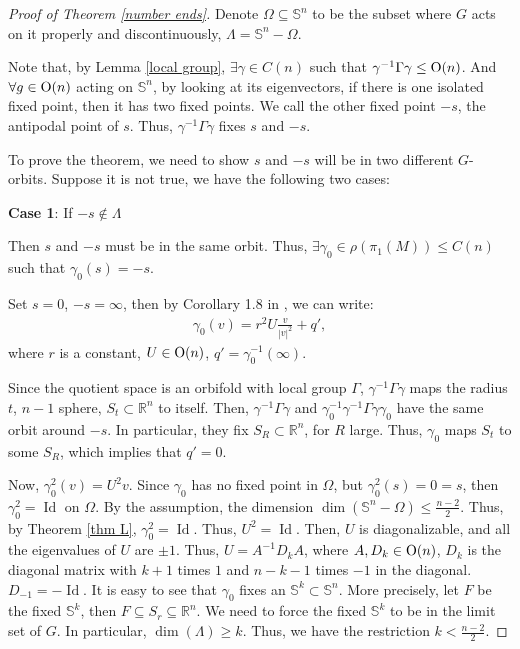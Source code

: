 \documentclass[12pt]{amsart}
\theoremstyle{definition}
\begin{document}
\begin{proof}[Proof of Theorem \ref{number ends}]

Denote $\Omega\subseteq\mathbb{S}^n$ to be the subset where $G$ acts on it properly and discontinuously, $\Lambda = \mathbb{S}^n - \Omega$.

Note that, by Lemma \ref{local group}, $\exists\gamma\in C(n)$ such that $\gamma^{-1}\Gamma\gamma\leq {\rm{O}}(n)$. And $\forall g\in {\rm{O}}(n)$ acting on $\mathbb{S}^n$, by looking at its eigenvectors, if there is one isolated fixed point, then it has two fixed points. We call the other fixed point $-s$, the antipodal point of $s$. Thus, $\gamma^{-1}\Gamma\gamma$ fixes $s$ and $-s$. 

To prove the theorem, we need to show $s$ and $-s$ will be in two different $G$-orbits. Suppose it is not true, we have the following two cases:

\textbf{Case 1}: If $-s\notin \Lambda$

Then $s$ and $-s$ must be in the same orbit. Thus, $\exists\gamma_0\in\rho(\pi_1(M))\leq C(n)$ such that $\gamma_0(s)=-s$.

Set $s=0$, $-s=\infty$, then by Corollary 1.8 in \cite{discrete_group}, we can write:
\begin{align*}
    \gamma_0(v)=r^2 U\frac{v}{|v|^2}+q',
\end{align*}
where $r$ is a constant, $U\in {\rm{O}}(n)$, $q'=\gamma_0^{-1}(\infty)$.

Since the quotient space is an orbifold with local group $\Gamma$, $\gamma^{-1}\Gamma\gamma$ maps the radius $t$, $n-1$ sphere, $S_t\subset \mathbb{R}^n$ to itself. Then, $\gamma^{-1}\Gamma\gamma$ and $\gamma_0^{-1}\gamma^{-1}\Gamma\gamma\gamma_0$ have the same orbit around $-s$. In particular, they fix $S_R\subset\mathbb{R}^n$, for $R$ large. Thus, $\gamma_0$ maps $S_t$ to some $S_R$, which implies that $q'=0$.

Now, $\gamma_0^2(v)=U^2 v$. Since $\gamma_0$ has no fixed point in $\Omega$, but $\gamma_0^2(s)=0=s$, then $\gamma_0^2=\operatorname{Id}$ on $\Omega$. By the assumption, the dimension $\operatorname{dim}(\mathbb{S}^n-\Omega)\leq \frac{n-2}{2}$. Thus, by Theorem \ref{thm L}, $\gamma_0^2=\operatorname{Id}$. Thus, $U^2=\operatorname{Id}$. Then, $U$ is diagonalizable, and all the eigenvalues of $U$ are $\pm 1$. Thus, $U=A^{-1} D_k A$, where $A,D_k\in {\rm{O}}(n)$, $D_k$ is the diagonal matrix with $k+1$ times $1$ and $n-k-1$ times $-1$ in the diagonal. $D_{-1}=-\operatorname{Id}$. It is easy to see that $\gamma_0$ fixes an $\mathbb{S}^k\subset\mathbb{S}^n$. More precisely, let $F$ be the fixed $\mathbb{S}^k$, then $F\subseteq S_r\subseteq\mathbb{R}^n$. We need to force the fixed $\mathbb{S}^k$ to be in the limit set of $G$. In particular, $\operatorname{dim}(\Lambda)\geq k$. Thus, we have the restriction $k<\frac{n-2}{2}$.


\end{proof}
\end{document}
